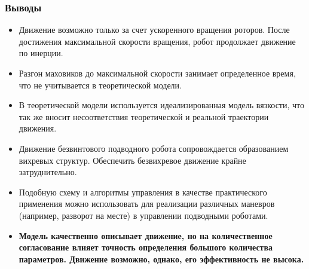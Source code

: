 \begin{frame}
\frametitle{Выводы}

\begin{itemize}
	\item	Движение возможно только за счет ускоренного вращения роторов. После достижения максимальной скорости вращения, робот продолжает движение по инерции.
	\item Разгон маховиков до максимальной скорости занимает определенное время, что не учитывается в теоретической модели. %
	\item В теоретической модели используется идеализированная модель вязкости, что так же вносит несоответствия теоретической и реальной траектории движения.
	
	\item	Движение безвинтового подводного робота сопровождается образованием вихревых структур. Обеспечить безвихревое движение крайне затруднительно.
	
	\item Подобную схему и алгоритмы управления в качестве практического применения можно использовать для реализации различных маневров (например, разворот на месте) в управлении подводными роботами.
	
	\item \textbf{Модель качественно описывает движение, но на количественное согласование влияет точность определения большого количества параметров. Движение возможно, однако, его эффективность не высока.}
\end{itemize}

\end{frame}

%
%
%
%
%


%

